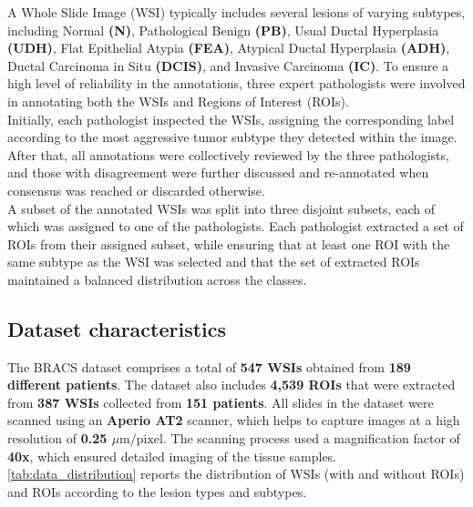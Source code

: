 \documentclass[
11pt, %
english, %
singlespacing, %
headsepline, %
]{project_structure}
\begin{document}
\noindent A Whole Slide Image (\acrshort{WSI}) typically includes several lesions of varying subtypes, including Normal \textbf{(\acrshort{N})}, Pathological Benign \textbf{(\acrshort{PB})}, Usual Ductal Hyperplasia \textbf{(\acrshort{UDH})}, Flat Epithelial Atypia \textbf{(\acrshort{FEA})}, Atypical Ductal Hyperplasia \textbf{(\acrshort{ADH})}, Ductal Carcinoma in Situ \textbf{(\acrshort{DCIS})}, and Invasive Carcinoma \textbf{(\acrshort{IC})}. To ensure a high level of reliability in the annotations, three expert pathologists were involved in annotating both the \acrshort{WSI}s and Regions of Interest (\acrshort{ROI}s).\\

\noindent Initially, each pathologist inspected the \acrshort{WSI}s, assigning the corresponding label according to the most aggressive tumor subtype they detected within the image. After that, all annotations were collectively reviewed by the three pathologists, and those with disagreement were further discussed and re-annotated when consensus was reached or discarded otherwise.\\

\noindent A subset of the annotated \acrshort{WSI}s was split into three disjoint subsets, each of which was assigned to one of the pathologists. Each pathologist extracted a set of \acrshort{ROI}s from their assigned subset, while ensuring that at least one \acrshort{ROI} with the same subtype as the \acrshort{WSI} was selected and that the set of extracted \acrshort{ROI}s maintained a balanced distribution across the classes.\\

\subsection{Dataset characteristics}
The \acrshort{BRACS} dataset comprises a total of \textbf{547 \acrshort{WSI}s} obtained from \textbf{189 different patients}. The dataset also includes \textbf{4,539 \acrshort{ROI}s} that were extracted from \textbf{387 \acrshort{WSI}s} collected from \textbf{151 patients}. 
All slides in the dataset were scanned using an \textbf{Aperio AT2} scanner, which helps to capture images at a high resolution of \textbf{0.25 $\mu\mathrm{m}/\mathrm{pixel}$}. The scanning process used a magnification factor of \textbf{40x}, which ensured detailed imaging of the tissue samples. \autoref{tab:data_distribution} reports the distribution of \acrshort{WSI}s (with and without \acrshort{ROI}s) and \acrshort{ROI}s according to the lesion types and subtypes.\\
\end{document}
